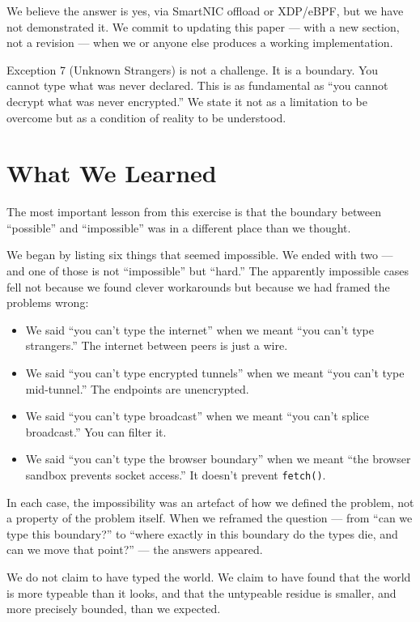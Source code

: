 \documentclass[11pt,a4paper]{article}
\begin{document}
We believe the answer is yes, via SmartNIC offload or XDP/eBPF, but we
have not demonstrated it. We commit to updating this paper --- with a
new section, not a revision --- when we or anyone else produces a
working implementation.

Exception 7 (Unknown Strangers) is not a challenge. It is a boundary.
You cannot type what was never declared. This is as fundamental as ``you
cannot decrypt what was never encrypted.'' We state it not as a
limitation to be overcome but as a condition of reality to be understood.

\section{What We Learned}

The most important lesson from this exercise is that the boundary between
``possible'' and ``impossible'' was in a different place than we thought.

We began by listing six things that seemed impossible. We ended with two
--- and one of those is not ``impossible'' but ``hard.'' The apparently
impossible cases fell not because we found clever workarounds but because
we had framed the problems wrong:

\begin{itemize}
\item We said ``you can't type the internet'' when we meant ``you can't
  type strangers.'' The internet between peers is just a wire.
\item We said ``you can't type encrypted tunnels'' when we meant ``you
  can't type mid-tunnel.'' The endpoints are unencrypted.
\item We said ``you can't type broadcast'' when we meant ``you can't
  splice broadcast.'' You can filter it.
\item We said ``you can't type the browser boundary'' when we meant ``the
  browser sandbox prevents socket access.'' It doesn't prevent
  \texttt{fetch()}.
\end{itemize}

In each case, the impossibility was an artefact of how we defined the
problem, not a property of the problem itself. When we reframed the
question --- from ``can we type this boundary?'' to ``where exactly in
this boundary do the types die, and can we move that point?'' --- the
answers appeared.

We do not claim to have typed the world. We claim to have found that
the world is more typeable than it looks, and that the untypeable
residue is smaller, and more precisely bounded, than we expected.
\end{document}
